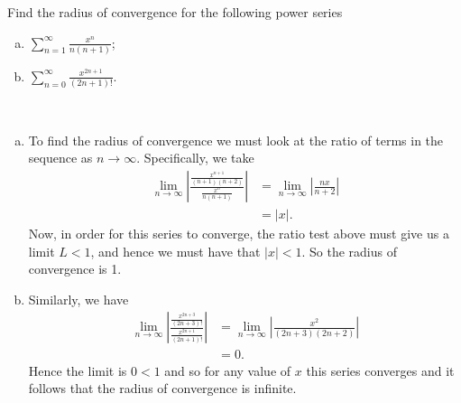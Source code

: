 \documentclass[12pt]{article} %
\begin{document}
\newpage
\begin{problem}
Find the radius of convergence for the following power series
\begin{enumerate}[(a)]
    \item $\displaystyle{\sum_{n=1}^\infty \frac{x^n}{n(n+1)}}$;
    \item $\displaystyle{\sum_{n=0}^\infty \frac{x^{2n+1}}{(2n+1)!}}$.
\end{enumerate}
\end{problem}
\begin{solution}~
\begin{enumerate}[(a)]
    \item To find the radius of convergence we must look at the ratio of terms in the sequence as $n\to \infty$. Specifically, we take
    \begin{align*}
        \lim_{n\to \infty} \left| \frac{\frac{x^{n+1}}{(n+1)(n+2)}}{\frac{x^n}{n(n+1)}}\right| &= \lim_{n\to \infty}\left| \frac{nx}{n+2}\right|\\
        &= |x|.
    \end{align*}
    Now, in order for this series to converge, the ratio test above must give us a limit $L<1$, and hence we must have that $|x|<1$. So the radius of convergence is 1.
    \item Similarly, we have
    \begin{align*}
        \lim_{n\to \infty} \left| \frac{\frac{x^{2n+3}}{(2n+3)!}}{\frac{x^{2n+1}}{(2n+1)!}} \right| &= \lim_{n\to \infty} \left|\frac{x^2}{(2n+3)(2n+2)}\right|\\
        &= 0.
    \end{align*}
    Hence the limit is $0<1$ and so for any value of $x$ this series converges and it follows that the radius of convergence is infinite.
\end{enumerate}
\end{solution}
\end{document}
